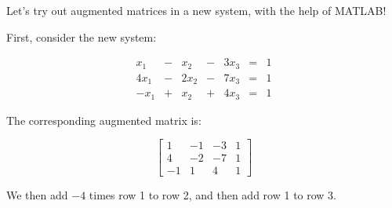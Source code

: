 \documentclass{ximera}
\begin{document}
\begin{example}\label{init:backsub}
Let's try out augmented matrices in a new system, with the help of MATLAB!

First, consider the new system:



$$\begin{array}{ccccccc}
      x_1 &- &x_2&-&3x_3&= &1 \\
   4x_1& -&2x_2&-&7x_3&=&1\\
   -x_1& +&x_2&+&4x_3&=&1
    \end{array}$$

The corresponding augmented matrix is: 


 
\[\left[\begin{array}{ccc|c} 
 1&-1&-3&1\\4&-2&-7&1\\-1&1&4&1
 \end{array}\right]\]

 

 We then add $-4$ times row 1 to row 2, and then add row 1 to row 3. 

\end{example}
\end{document}
